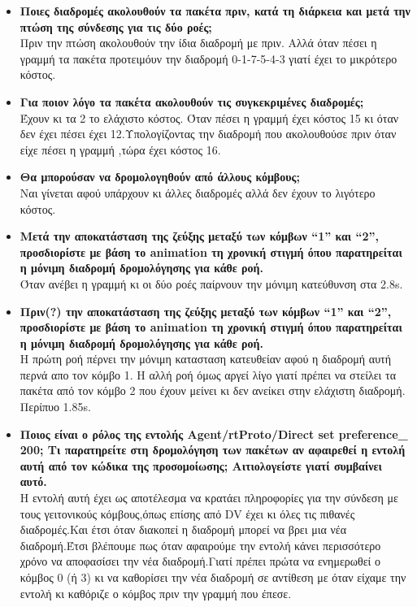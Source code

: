 \documentclass{article}
\begin{document}
\begin{itemize}
	\item
	\textbf{Ποιες διαδρομές ακολουθούν τα πακέτα πριν, κατά τη διάρκεια και μετά την πτώση της
		σύνδεσης για τις δύο ροές;}\\
	Πριν την πτώση ακολουθούν την ίδια διαδρομή με πριν. Αλλά όταν πέσει η γραμμή τα πακέτα προτειμόυν  την διαδρομή 0-1-7-5-4-3 γιατί έχει το μικρότερο κόστος.
	\item
	\textbf{Για ποιον λόγο τα πακέτα ακολουθούν τις συγκεκριμένες διαδρομές; }
	\\ Έχουν κι τα 2 το ελάχιστο κόστος. Όταν πέσει η γραμμή έχει κόστος 15 κι όταν δεν έχει πέσει έχει 12.Υπολογίζοντας την διαδρομή που ακολουθούσε πριν όταν είχε πέσει η γραμμή ,τώρα έχει κόστος 16.
	\item
	\textbf{Θα μπορούσαν να δρομολογηθούν από άλλους κόμβους;}\\
	Ναι γίνεται αφού υπάρχουν κι άλλες διαδρομές αλλά δεν έχουν το λιγότερο κόστος.
	\item
	\textbf{Μετά την αποκατάσταση της ζεύξης μεταξύ των κόμβων “1” και “2”, προσδιορίστε με
		βάση το animation τη χρονική στιγμή όπου παρατηρείται η μόνιμη διαδρομή
		δρομολόγησης για κάθε ροή. }\\ Όταν ανέβει η γραμμή κι οι δύο ροές παίρνουν την μόνιμη κατεύθυνση στα 2.8s.
	\item \textbf{Πριν(?) την αποκατάσταση της ζεύξης μεταξύ των κόμβων “1” και “2”, προσδιορίστε με
		βάση το animation τη χρονική στιγμή όπου παρατηρείται η μόνιμη διαδρομή
		δρομολόγησης για κάθε ροή. } \\ Η πρώτη ροή πέρνει την μόνιμη κατασταση κατευθείαν αφού η διαδρομή αυτή περνά απο τον κόμβο 1. Η αλλή ροή όμως αργεί λίγο γιατί πρέπει να στείλει τα πακέτα από τον κόμβο 2 που έχουν μείνει κι δεν ανείκει στην ελάχιστη διαδρομή. Περίπυο 1.85s.
	\item \textbf{Ποιος είναι ο ρόλος της εντολής Agent/rtProto/Direct set preference\_ 200;
		Τι παρατηρείτε στη δρομολόγηση των πακέτων αν αφαιρεθεί η εντολή αυτή από τον
		κώδικα της προσομοίωσης; Αιτιολογείστε γιατί συμβαίνει αυτό. } \\	
	Η εντολή αυτή έχει ως αποτέλεσμα να κρατάει πληροφορίες για την σύνδεση με τους γειτονικούς κόμβους,όπως επίσης από DV έχει κι όλες τις πιθανές διαδρομές.Και έτσι όταν διακοπεί η  διαδρομή μπορεί να βρει μια νέα διαδρομή.Έτσι βλέπουμε πως όταν αφαιρούμε την εντολή κάνει περισσότερο χρόνο να αποφασίσει την νέα διαδρομή.Γιατί πρέπει πρώτα να ενημερωθεί ο κόμβος 0 (ή 3) κι να καθορίσει την νέα διαδρομή σε αντίθεση με όταν είχαμε την εντολή κι καθόριζε ο κόμβος πριν την γραμμή που έπεσε.
\end{itemize}

\end{document}
